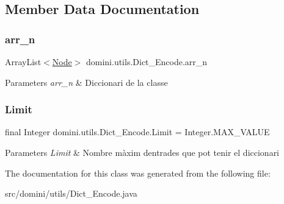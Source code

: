 \subsection{Member Data Documentation}
\mbox{\label{classdomini_1_1utils_1_1Dict__Encode_abc506ae01222e16d9b6581efbdad1a97}} 
\subsubsection{\texorpdfstring{arr\+\_\+n}{arr\_n}}
{\footnotesize\ttfamily Array\+List$<$\hyperlink{classdomini_1_1utils_1_1Node}{Node}$>$ domini.\+utils.\+Dict\+\_\+\+Encode.\+arr\+\_\+n\hspace{0.3cm}{\ttfamily [private]}}


\begin{DoxyParams}{Parameters}
{\em arr\+\_\+n} & Diccionari de la classe \\
\hline
\end{DoxyParams}
\mbox{\label{classdomini_1_1utils_1_1Dict__Encode_a48fe9a878056a119ad36a0aad2727a13}} 
\subsubsection{\texorpdfstring{Limit}{Limit}}
{\footnotesize\ttfamily final Integer domini.\+utils.\+Dict\+\_\+\+Encode.\+Limit = Integer.\+M\+A\+X\+\_\+\+V\+A\+L\+UE\hspace{0.3cm}{\ttfamily [static]}}


\begin{DoxyParams}{Parameters}
{\em Limit} & Nombre màxim d\textquotesingle{}entrades que pot tenir el diccionari \\
\hline
\end{DoxyParams}


The documentation for this class was generated from the following file\+:\begin{DoxyCompactItemize}
\item 
src/domini/utils/Dict\+\_\+\+Encode.\+java\end{DoxyCompactItemize}
